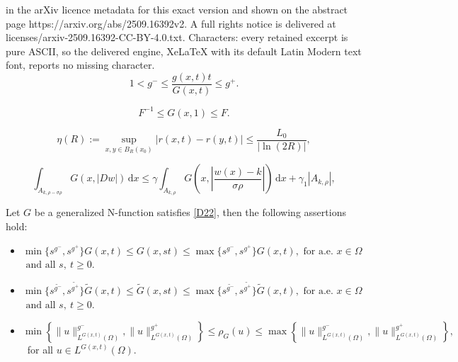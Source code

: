 \documentclass[10pt,a4paper]{amsart}
\begin{document}
in the arXiv licence metadata for this exact version and shown on the abstract page https://arxiv.org/abs/2509.16392v2. A full rights notice is delivered at licenses/arxiv-2509.16392-CC-BY-4.0.txt. Characters: every retained excerpt is pure ASCII, so the delivered engine, XeLaTeX with its default Latin Modern text font, reports no missing character.
\begin{equation}\label{D22}
1 < g^- \leq \frac{g(x,t)t}{G(x,t)} \leq g^+ .
\tag{G0}
\end{equation}

\begin{equation}\label{GG1}
F^{-1} \leq G(x,1) \leq F.
\tag{G1}
\end{equation}

\begin{equation}\label{GG3} 
\eta(R):= \sup_{x,y \in B_R(x_0)} \left| r\left(x,t\right) - r\left(y,t\right) \right| 
\leq \frac{L_0}{|\ln (2R)|},
\tag{G3}
\end{equation}

\begin{equation}\label{2.4}
\int_{A_{k,\rho - \sigma \rho}} G(x,|Dw|) \, \mathrm{d}x \leq \gamma \int_{A_{k,\rho}} G\left(x,\left| \frac{w(x) - k}{\sigma \rho} \right|\right) \, \mathrm{d}x + \gamma_1 |A_{k,\rho}|,
\end{equation}

\begin{proposition} \label{zoo}
     Let $G$ be a generalized \textnormal{N}-function satisfies \eqref{D22}, then the following assertions hold:
     \begin{itemize}
    \item [(1)] $\min \{s^{g^-}, s^{g^+}\}G(x,t)\leq  G(x,s t)\leq \max \{ s^{g^-}, s^{g^+}\}G(x,t),\text{ for a.e. } x \in \Omega$ $\text{ and all }  s, \ t \geq 0. $
     \item [(2)] $\min \{s^{\widetilde{g^-}}, s^{\widetilde{g^+}}\}\widetilde{G}(x,t)\leq  \widetilde{G}(x,s t)\leq \max \{ s^{\widetilde{g^-}}, s^{\widetilde{g^+}}\}\widetilde{G}(x,t),\text{ for a.e. } x \in \Omega$ $\text{ and all }  s, \ t \geq 0. $
 \item [(3)]  $\min \left\{\|u\|_{L^{G(x,t)}(\Omega)}^{g^-},\|u\|_{L^{G(x,t)}(\Omega)}^{g^+}\right\} \leq \rho_{G}(u) \leq\max \left\{\|u\|_{L^{G(x,t)}(\Omega)}^{g^-},\|u\|_{L^{G(x,t)}(\Omega)}^{g^+}\right\},$ \ for all $  u\in L^{G(x,t)}(\Omega)$.
\end{itemize}
\end{proposition}
\end{document}
